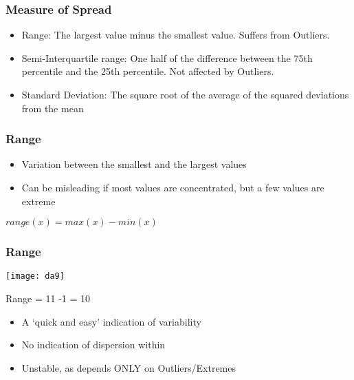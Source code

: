 \begin{frame}[fragile]\frametitle{Measure of Spread}	

\begin{itemize}
\item Range: The largest value minus the smallest value. Suffers from Outliers.
\item Semi-Interquartile range: One half of the difference between the 75th percentile and the 25th percentile. Not affected by Outliers.
\item Standard Deviation:	The square root of the average of the squared deviations from the mean
\end{itemize}


\end{frame}



\begin{frame}[fragile]\frametitle{Range}	
\begin{itemize}
\item Variation between the smallest and the largest values
\item Can be misleading if most values are concentrated, but a few values are extreme
\end{itemize}
$range(x) = max(x) - min(x)$

\end{frame}

\begin{frame}[fragile]\frametitle{Range}	
\begin{center}
\texttt{[image: da9]}
\end{center}
Range = 11 -1 = 10

\begin{itemize}
\item A `quick and easy' indication of variability
\item No indication of dispersion within
\item Unstable, as depends ONLY on Outliers/Extremes
\end{itemize}
\end{frame}

